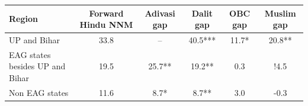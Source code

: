 \begin{tabular}{lccccc}
\hline
Region & Forward Hindu NNM & Adivasi gap & Dalit gap & OBC gap & Muslim gap \\
\hline
UP and Bihar&33.8&--&40.5***&11.7*&20.8**\\
EAG states besides UP and Bihar&19.5&25.7**&19.2**&0.3&!4.5\\
Non EAG states&11.6&8.7*&8.7**&3.0&-0.3\\
\hline
\end{tabular}
